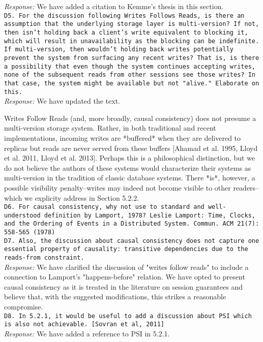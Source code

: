 \documentclass[10pt]{article}
\newcommand{\reviewer}[1] {\noindent\texttt{#1}\\}
\newcommand{\response}[1] {\noindent\textit{Response: } #1\\}
\begin{document}
\response{We have added a citation to Kemme's thesis in this section.}

\reviewer{D5. For the discussion following Writes Follows Reads, is there an assumption that the underlying storage layer is multi-version? If not, then isn't holding back a client's write equivalent to blocking it, which will result in unavailability as the blocking can be indefinite. If multi-version, then wouldn't holding back writes potentially prevent the system from surfacing any recent writes? That is, is there a possibility that even though the system continues accepting writes, none of the subsequent reads from other sessions see those writes? In that case, the system might be available but not "alive." Elaborate on this.}

\response{We have updated the text.

Writes Follow Reads (and, more broadly, causal consistency) does not
presume a multi-version storage system. Rather, in both traditional
and recent implementations, incoming writes are *buffered* when they
are delivered to replicas but reads are never served from these
buffers [Ahamad et al. 1995, Lloyd et al. 2011, Lloyd et
al. 2013]. Perhaps this is a philosophical distinction, but we do not
believe the authors of these systems would characterize their systems
as multi-version in the tradition of classic database systems. There
*is*, however, a possible visibility penalty--writes may indeed not
become visible to other readers--which we explicity address in Section
5.2.2.}

\reviewer{D6. For causal consistency, why not use to standard and well-understood definition by Lamport, 1978? Leslie Lamport: Time, Clocks, and the Ordering of Events in a Distributed System. Commun. ACM 21(7): 558-565 (1978)\\
D7. Also, the discussion about causal consistency does not capture one essential property of causality: transitive dependencies due to the reads-from constraint.}

\response{We have clarified the discussion of "writes follow reads" to include a
connection to Lamport's "happens-before" relation. We have opted to
present causal consistency as it is treated in the literature on
session guarantees and believe that, with the suggested modifications,
this strikes a reasonable compromise.}

\reviewer{D8. In 5.2.1, it would be useful to add a discussion about PSI which is also not achievable. [Sovran et al, 2011]}

\response{We have added a reference to PSI in 5.2.1.}
\end{document}
